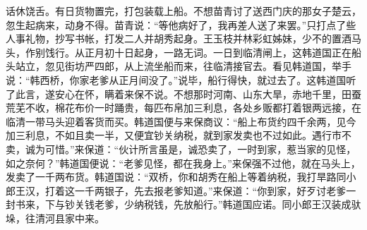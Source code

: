 话休饶舌。有日货物置完，打包装载上船。不想苗青讨了送西门庆的那女子楚云，忽生起病来，动身不得。苗青说：“等他病好了，我再差人送了来罢。”只打点了些人事礼物，抄写书帐，打发二人并胡秀起身。王玉枝并林彩虹姊妹，少不的置酒马头，作别饯行。从正月初十日起身，一路无词。一日到临清闸上，这韩道国正在船头站立，忽见街坊严四郎，从上流坐船而来，往临清接官去。看见韩道国，举手说：“韩西桥，你家老爹从正月间没了。”说毕，船行得快，就过去了。这韩道国听了此言，遂安心在怀，瞒着来保不说。不想那时河南、山东大旱，赤地千里，田蚕荒芜不收，棉花布价一时踊贵，每匹布帛加三利息，各处乡贩都打着银两远接，在临清一带马头迎着客货而买。韩道国便与来保商议：“船上布货约四千余两，见今加三利息，不如且卖一半，又便宜钞关纳税，就到家发卖也不过如此。遇行市不卖，诚为可惜。”来保道：“伙计所言虽是，诚恐卖了，一时到家，惹当家的见怪，如之奈何？”韩道国便说：“老爹见怪，都在我身上。”来保强不过他，就在马头上，发卖了一千两布货。韩道国说：“双桥，你和胡秀在船上等着纳税，我打旱路同小郎王汉，打着这一千两银子，先去报老爹知道。”来保道：“你到家，好歹讨老爹一封书来，下与钞关钱老爹，少纳税钱，先放船行。”韩道国应诺。同小郎王汉装成驮垛，往清河县家中来。

